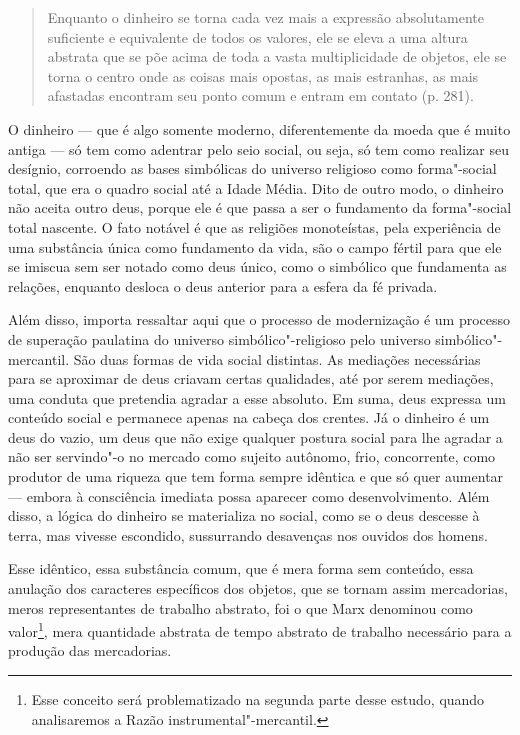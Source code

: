 \begin{quote}
Enquanto o dinheiro se torna cada vez mais a expressão absolutamente
suficiente e equivalente de todos os valores, ele se eleva a uma altura
abstrata que se põe acima de toda a vasta multiplicidade de objetos, ele
se torna o centro onde as coisas mais opostas, as mais estranhas, as
mais afastadas encontram seu ponto comum e entram em contato (p. 281).
\end{quote}

O dinheiro --- que é algo somente moderno, diferentemente da
moeda que é muito antiga --- só tem como adentrar pelo seio social, ou
seja, só tem como realizar seu desígnio, corroendo as bases simbólicas do
universo religioso como forma"-social total, que era o quadro social até
a Idade Média. Dito de outro modo, o dinheiro não aceita outro deus,
porque ele é que passa a ser o fundamento da forma"-social total nascente. O fato
notável é que as religiões monoteístas, pela experiência de uma
substância única como fundamento da vida, são o campo fértil para que
ele se imiscua sem ser notado como deus único, como o simbólico que
fundamenta as relações, enquanto desloca o deus anterior para a esfera
da fé privada.

Além disso, importa ressaltar aqui que o processo de
modernização é um processo de superação paulatina do universo
simbólico"-religioso pelo universo simbólico"-mercantil. São duas formas
de vida social distintas. As mediações necessárias para se aproximar de
deus criavam certas qualidades, até por serem mediações, uma conduta que
pretendia agradar a esse absoluto. Em suma, deus expressa um conteúdo
social e permanece apenas na cabeça dos crentes. Já o dinheiro é um deus
do vazio, um deus que não exige qualquer postura social para lhe agradar
a não ser servindo"-o no mercado como sujeito autônomo, frio,
concorrente, como produtor de uma riqueza que tem forma sempre idêntica
e que só quer aumentar --- embora à consciência imediata possa aparecer
como desenvolvimento. Além disso, a lógica do dinheiro se materializa no
social, como se o deus descesse à terra, mas vivesse escondido,
sussurrando desavenças nos ouvidos dos homens.

Esse idêntico, essa substância comum, que é mera forma sem conteúdo,
essa anulação dos caracteres específicos dos objetos, que se tornam
assim mercadorias, meros representantes de trabalho abstrato, foi o que
Marx denominou como valor\footnote{Esse conceito será problematizado na
  segunda parte desse estudo, quando analisaremos a Razão
  instrumental"-mercantil.}, mera quantidade abstrata de tempo abstrato de
trabalho necessário para a produção das mercadorias.


